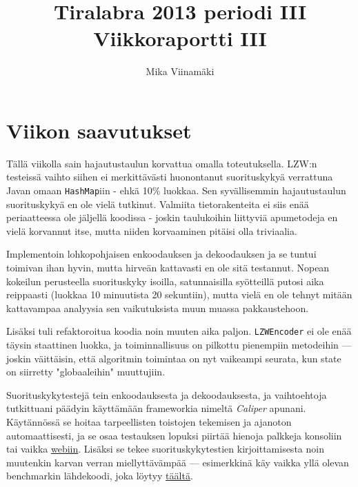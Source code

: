 \documentclass{article}
\begin{document}
\title{Tiralabra 2013 periodi III \\ Viikkoraportti III}
\author{Mika Viinamäki}
\maketitle

\section{Viikon saavutukset}

Tällä viikolla sain hajautustaulun korvattua omalla toteutuksella. LZW:n testeissä vaihto siihen ei merkittävästi huonontanut suorituskykyä verrattuna Javan omaan \verb+HashMap+iin - ehkä 10\% luokkaa. Sen syvällisemmin hajautustaulun suorituskykyä en ole vielä tutkinut. Valmiita tietorakenteita ei siis enää periaatteessa ole jäljellä koodissa - joskin taulukoihin liittyviä apumetodeja en vielä korvannut itse, mutta niiden korvaaminen pitäisi olla triviaalia.

Implementoin lohkopohjaisen enkoodauksen ja dekoodauksen ja se tuntui toimivan ihan hyvin, mutta hirveän kattavasti en ole sitä testannut. Nopean kokeilun perusteella suorituskyky isoilla, satunnaisilla syötteillä putosi aika reippaasti (luokkaa 10 minuutista 20 sekuntiin), mutta vielä en ole tehnyt mitään kattavampaa analyysia sen vaikutuksista muun muassa pakkaustehoon.

Lisäksi tuli refaktoroitua koodia noin muuten aika paljon. \verb+LZWEncoder+ ei ole enää täysin staattinen luokka, ja toiminnallisuus on pilkottu pienempiin metodeihin --- joskin väittäisin, että algoritmin toimintaa on nyt vaikeampi seurata, kun state on siirretty "globaaleihin" muuttujiin.

Suorituskykytestejä tein enkoodauksesta ja dekoodauksesta, ja vaihtoehtoja tutkittuani päädyin käyttämään frameworkia nimeltä \emph{Caliper} apunani. Käytännössä se hoitaa tarpeellisten toistojen tekemisen ja ajanoton automaattisesti, ja se osaa testauksen lopuksi piirtää hienoja palkkeja konsoliin tai vaikka \href{http://microbenchmarks.appspot.com/run/kauhsa@viuhka.fi/kauhsa.compression.lzw.benchmarks.LZWRandomBenchmark}{webiin}. Lisäksi se tekee suorituskykytestien kirjoittamisesta noin muutenkin karvan verran miellyttävämpää --- esimerkkinä käy vaikka yllä olevan benchmarkin lähdekoodi, joka löytyy \href{https://github.com/Kauhsa/tiralabra-compression/blob/master/project/src/main/java/kauhsa/compression/lzw/benchmarks/LZWPerformanceBenchmark.java}{täältä}.
\end{document}
